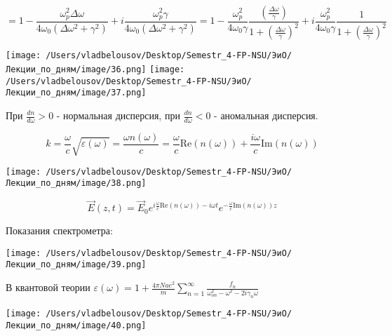 \documentclass[12pt, a4paper]{report}
\begin{document}
\[ =1  -\frac{\omega_p ^2 \Delta \omega}{4 \omega_0 (\Delta \omega ^2 + \gamma ^2)} + i \frac{ \omega_p ^2 \gamma }{4 \omega_0(\Delta \omega ^2 + \gamma ^2) }= 1- \frac{ \omega_p ^2 }{4 \omega_0 \gamma }\frac{ ( \frac{\Delta \omega}{\gamma} )}{1+ \left( \frac{\Delta \omega}{\gamma}  \right) ^2 } + i \frac{\omega_p ^2 }{4 \omega_0\gamma } \frac{ 1}{1+ \left( \frac{\Delta \omega}{\gamma}  \right) ^2}    \] 

\begin{center}
    \texttt{[image: /Users/vladbelousov/Desktop/Semestr\_4-FP-NSU/ЭиО/Лекции\_по\_дням/image/36.png]}
    \texttt{[image: /Users/vladbelousov/Desktop/Semestr\_4-FP-NSU/ЭиО/Лекции\_по\_дням/image/37.png]}
\end{center}

\begin{center}
    При \( \displaystyle \frac{dn}{d \omega} >0   \) - нормальная дисперсия, при \( \displaystyle \frac{dn}{d \omega } < 0   \) - аномальная дисперсия.
\end{center}

\[ k = \frac{\omega}{c }  \sqrt{ \varepsilon ( \omega )} = \frac{ \omega n ( \omega )}{c }  = \frac{\omega}{ c } \mathrm{Re } (n (\omega))+ \frac{i \omega}{c } \mathrm{Im }  (n (\omega))    \] 

\begin{center}
    \texttt{[image: /Users/vladbelousov/Desktop/Semestr\_4-FP-NSU/ЭиО/Лекции\_по\_дням/image/38.png]}
\end{center}

\[ \vec{E } (z, t ) = \vec{E } _ 0 e ^{ i \frac{\omega}{c } \mathrm{Re } (n ( \omega )) - i \omega t  } e^{- \frac{\omega}{ c } \mathrm{Im } (n ( \omega )) z  } \] 

Показания спектрометра: 

\begin{center}
    \texttt{[image: /Users/vladbelousov/Desktop/Semestr\_4-FP-NSU/ЭиО/Лекции\_по\_дням/image/39.png]}
\end{center}

В квантовой теории \(\displaystyle  \varepsilon ( \omega ) = 1 + \frac{4 \pi Na e ^2 }{m } \sum_{n=1}^{\infty  } \frac{f_n }{\omega_{on } ^2 - \omega ^2 -2 i \gamma_n \omega }    \) 

\begin{center}
    \texttt{[image: /Users/vladbelousov/Desktop/Semestr\_4-FP-NSU/ЭиО/Лекции\_по\_дням/image/40.png]}
\end{center}
\end{document}
